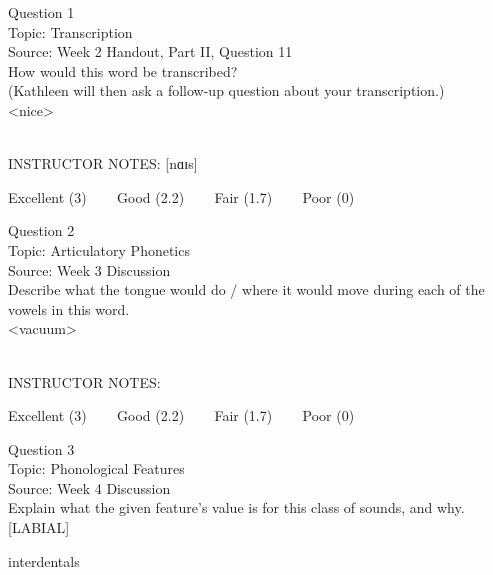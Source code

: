 \documentclass[12pt]{article}
\begin{document}
\begin{center}
\textbf{{\color{blue}{\HUGE START OF EXAM\\}}}

\textbf{{\color{blue}{\HUGE Student ID: 18870\\}}}

\textbf{{\color{blue}{\HUGE \\}}}

\end{center}
\newpage

{\large Question 1}\\

Topic: Transcription\\
Source: Week 2 Handout, Part II, Question 11\\

How would this word be transcribed?\\ (Kathleen will then ask a follow-up question about your transcription.)\\

<nice>


~\\
INSTRUCTOR NOTES: [nɑɪs]


\vfill
Excellent (3) ~~~ Good (2.2) ~~~ Fair (1.7) ~~~ Poor (0)
\newpage

{\large Question 2}\\

Topic: Articulatory Phonetics\\
Source: Week 3 Discussion\\

Describe what the tongue would do / where it would move during each of the vowels in this word.\\

<vacuum>


~\\
INSTRUCTOR NOTES: 


\vfill
Excellent (3) ~~~ Good (2.2) ~~~ Fair (1.7) ~~~ Poor (0)
\newpage

{\large Question 3}\\

Topic: Phonological Features\\
Source: Week 4 Discussion\\

Explain what the given feature’s value is for this class of sounds, and why.\\

{[LABIAL]}

interdentals
\end{document}
